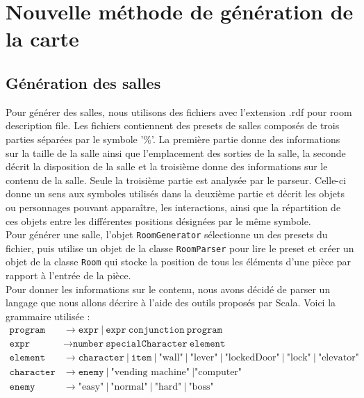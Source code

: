 \documentclass[10pt,a4paper]{article}
\begin{document}
\section{Nouvelle méthode de génération de la carte}
\subsection{Génération des salles}

Pour générer des salles, nous utilisons des fichiers avec l'extension .rdf pour room description file. Les fichiers contiennent des presets de salles composés de trois parties séparées par le symbole '\%'. La première partie donne des informations sur la taille de la salle ainsi que l'emplacement des sorties de la salle, la seconde décrit la disposition de la salle et la troisième donne des informations sur le contenu de la salle. Seule la troisième partie est analysée par le parseur. Celle-ci donne un sens aux symboles utilisés dans la deuxième partie et décrit les objets ou personnages pouvant apparaître, les interactions, ainsi que la répartition de ces objets entre les différentes positions désignées par le même symbole.\\
Pour générer une salle, l'objet \texttt{RoomGenerator} sélectionne un des presets du fichier, puis utilise un objet de la classe \texttt{RoomParser} pour lire le preset et créer un objet de la classe \texttt{Room} qui stocke la position de tous les éléments d'une pièce par rapport à l'entrée de la pièce.\\
Pour donner les informations sur le contenu, nous avons décidé de parser un langage que nous allons décrire à l'aide des outils proposés par Scala. Voici la grammaire utilisée :\\
\begin{align*}
	\texttt{program}   & \to \texttt{expr}\ |\ \texttt{expr}\ \texttt{conjunction}\ \texttt{program}                                                                   \\
	\texttt{expr}      & \to \texttt{number}\ \texttt{specialCharacter}\ \texttt{element}                                                                              \\
	\texttt{element}   & \to \texttt{character}\ |\ \texttt{item}\ |\ \mbox{"wall"}\ |\ \mbox{"lever"}\ |\ \mbox{"lockedDoor"}\ |\ \mbox{"lock"}\ |\ \mbox{"elevator"} \\
	\texttt{character} & \to \texttt{enemy}\ |\ \mbox{"vending machine"}\ | \mbox{"computer"}                                                                          \\
	\texttt{enemy}     & \to \mbox{"easy"}\ |\ \mbox{"normal"}\ |\ \mbox{"hard"}\ |\ \mbox{"boss"}                                                                     \\
\end{align*}
\end{document}
